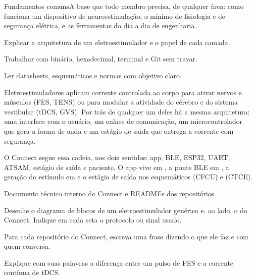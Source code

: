 \begin{parte}{Fundamentos comuns}{A base que todo membro precisa, de qualquer área: como funciona um dispositivo de neuroestimulação, o mínimo de fisiologia e de segurança elétrica, e as ferramentas do dia a dia de engenharia.}
  \item Explicar a arquitetura de um eletroestimulador e o papel de cada camada.
  \item Trabalhar com binário, hexadecimal, terminal e Git sem travar.
  \item Ler datasheets, esquemáticos e normas com objetivo claro.
\end{parte}

Eletroestimuladores aplicam corrente controlada ao corpo para ativar nervos e músculos (FES, TENS) ou para modular a atividade do cérebro e do sistema vestibular (tDCS, GVS). Por trás de qualquer um deles há a mesma arquitetura: uma interface com o usuário, um enlace de comunicação, um microcontrolador que gera a forma de onda e um estágio de saída que entrega a corrente com segurança.

\begin{noproduto}
O Connect segue essa cadeia, nos dois sentidos: app, BLE, ESP32, UART, ATSAM, estágio de saída e paciente. O app vive em , a ponte BLE em , a geração do estímulo em  e o estágio de saída nos esquemáticos  (CFCU) e  (CTCE).
\end{noproduto}

\begin{paraestudar}
  \item {}
  \item {}
  \item {}
  \item Documento técnico interno do Connect e READMEs dos repositórios
\end{paraestudar}

\begin{pratique}
  \item Desenhe o diagrama de blocos de um eletroestimulador genérico e, ao lado, o do Connect. Indique em cada seta o protocolo ou sinal usado.
  \item Para cada repositório do Connect, escreva uma frase dizendo o que ele faz e com quem conversa.
  \item Explique com suas palavras a diferença entre um pulso de FES e a corrente contínua de tDCS.
\end{pratique}

